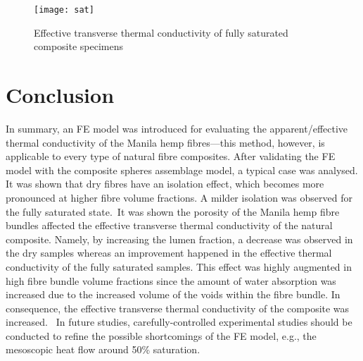 \begin{figure}[!h]{}
  \centering
\texttt{[image: sat]}
  \caption{Effective transverse thermal conductivity of fully saturated composite specimens}
  \label{fig:saturated}
\end{figure}
\newpage
\section{Conclusion}
\red
	In summary, an FE model was introduced for evaluating the apparent/effective thermal conductivity of the Manila hemp fibres---this method, however, is applicable to every type of natural fibre composites. After validating the FE model with the composite spheres assemblage model, a typical case was analysed. It was shown that dry fibres have an isolation effect, which becomes more pronounced at higher fibre volume fractions. A milder isolation was observed for the fully saturated state.\bl\ It was shown the porosity of the Manila hemp fibre bundles affected the effective transverse thermal conductivity of the natural composite. Namely, by increasing the lumen fraction, a decrease was observed in the dry samples whereas an improvement happened in the effective thermal conductivity of the fully saturated samples. This effect was highly augmented in high fibre bundle volume fractions since the amount of water absorption was increased due to the increased volume of the voids within the fibre bundle. In consequence, the effective transverse thermal conductivity of the composite was increased. \red\ In future studies, carefully-controlled experimental studies should be conducted to refine the possible shortcomings of the FE model, e.g., the mesoscopic heat flow around 50\% saturation.\bl



